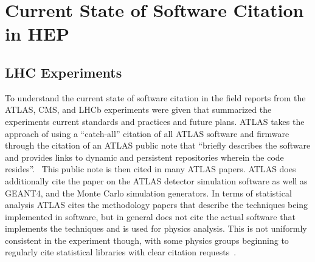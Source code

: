 \section{Current State of Software Citation in HEP}\label{sec:current_state}

\subsection{LHC Experiments}\label{sec:lhc_experiments}

To understand the current state of software citation in the field reports from the ATLAS, CMS, and LHCb experiments were given that summarized the experiments current standards and practices and future plans.
ATLAS takes the approach of using a ``catch-all'' citation of all ATLAS software and firmware through the citation of an ATLAS public note that ``briefly describes the software and provides links to dynamic and persistent repositories wherein the code resides''.~\cite{ATL-SOFT-PUB-2021-001}
This public note is then cited in many ATLAS papers.
ATLAS does additionally cite the paper on the ATLAS detector simulation software as well as GEANT4, and the Monte Carlo simulation generators.
In terms of statistical analysis ATLAS cites the methodology papers that describe the techniques being implemented in software, but in general does not cite the actual software that implements the techniques and is used for physics analysis.
This is not uniformly consistent in the experiment though, with some physics groups beginning to regularly cite statistical libraries with clear citation requests~\cite{pyhf,pyhf_joss}.

